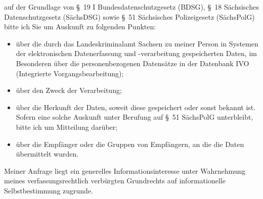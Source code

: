 auf der Grundlage von §~19 I Bundesdatenschutzgesetz (BDSG),
§~18 Sächsisches Datenschutzgesetz (SächsDSG) sowie
§~51 Sächsisches Polizeigesetz (SächsPolG) bitte ich Sie um Auskunft zu folgenden
Punkten:

\begin{itemize}
  \item über die durch das Landeskriminalamt Sachsen zu meiner Person in Systemen der
  elektronischen Datenerfassung und -verarbeitung gespeicherten Daten, im Besonderen
  über die personenbezogenen Datensätze in der Datenbank IVO (Integrierte Vorgangsbearbeitung);

  \item über den Zweck der Verarbeitung;

  \item über die Herkunft der Daten, soweit diese gespeichert oder sonst bekannt
  ist. Sofern eine solche Auskunft unter Berufung auf §~51 SächsPolG unterbleibt,
  bitte ich um Mitteilung darüber;

  \item über die Empfänger oder die Gruppen von Empfängern, an die die Daten übermittelt wurden.
\end{itemize}

Meiner Anfrage liegt ein generelles Informationsinteresse unter Wahrnehmung
meines verfassungsrechtlich verbürgten Grundrechts auf informationelle
Selbstbestimmung zugrunde.
